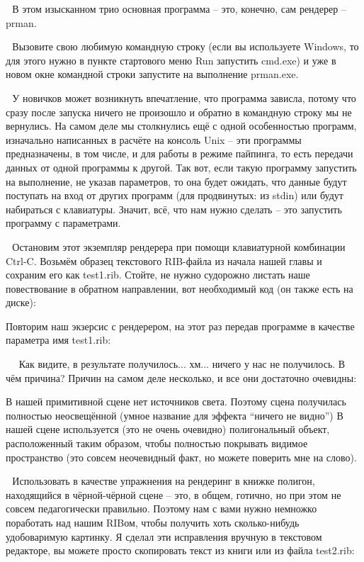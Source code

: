   В этом изысканном трио основная программа – это,
    конечно, сам рендерер – prman.

  Вызовите свою любимую командную строку (если вы
    используете Windows, то для этого нужно в пункте стартового меню
    Run запустить cmd.exe) и уже в новом окне командной строки
    запустите на выполнение prman.exe. 

 
 У новичков может возникнуть впечатление, что
    программа зависла, потому что сразу после запуска ничего не
    произошло и обратно в командную строку мы не вернулись. На самом
    деле мы столкнулись ещё с одной особенностью программ, изначально
    написанных в расчёте на консоль Unix – эти программы предназначены,
    в том числе, и для работы в режиме пайпинга, то есть передачи
    данных от одной программы к другой. Так вот, если такую программу
    запустить на выполнение, не указав параметров, то она будет
    ожидать, что данные будут поступать на вход от других программ (для
    продвинутых: из stdin) или будут набираться с клавиатуры. Значит,
    всё, что нам нужно сделать – это запустить программу с
    параметрами.

  Остановим этот экземпляр рендерера при помощи
    клавиатурной комбинации Ctrl-C. Возьмём образец текстового
    RIB-файла из начала нашей главы и сохраним его как test1.rib.
    Стойте, не нужно судорожно листать наше повествование в обратном
    направлении, вот необходимый код (он также есть на
    диске):


Повторим наш экзерсис с рендерером, на этот раз
    передав программе в качестве параметра имя test1.rib:

 
 Как видите, в результате получилось... хм... ничего
    у нас не получилось. В чём причина? Причин на самом деле несколько,
    и все они достаточно очевидны:
  
     В нашей примитивной сцене нет источников света.
      Поэтому сцена получилась полностью неосвещённой (умное название для
      эффекта “ничего не видно”)
     В нашей сцене используется (это не очень очевидно)
      полигональный объект, расположенный таким образом, чтобы полностью
      покрывать видимое пространство (это совсем неочевидный факт, но
      можете поверить мне на слово).
  
  Использовать в качестве упражнения на рендеринг в
    книжке полигон, находящийся в чёрной-чёрной сцене – это, в общем,
    готично, но при этом не совсем педагогически правильно. Поэтому нам
    с вами нужно немножко поработать над нашим RIBом, чтобы
    получить хоть сколько-нибудь удобоваримую картинку. Я сделал эти
    исправления вручную в текстовом редакторе, вы можете просто
    скопировать текст из книги или из файла test2.rib:

